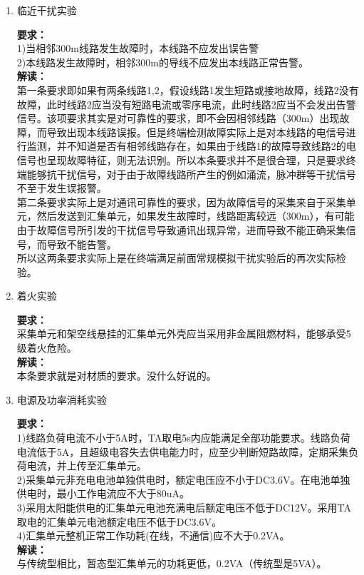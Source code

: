\documentclass{article}
\begin{document}
\begin{CJK}{UTF8}{gbsn}
\begin{enumerate}
\item 临近干扰实验	
	\par
	\textbf{要求：}\\
	1)当相邻300m线路发生故障时，本线路不应发出误告警\\
	2)本线路发生故障时，相邻300m的导线不应发出本线路正常告警。\\
	\textbf{解读：}\\
	第一条要求即如果有两条线路1,2，假设线路1发生短路或接地故障，线路2没有故障，此时线路2应当没有短路电流或零序电流，此时线路2应当不会发出告警信号。该项要求其实是对可靠性的要求，即不会因相邻线路（300m）出现故障，而导致出现本线路误报。但是终端检测故障实际上是对本线路的电信号进行监测，并不知道是否有相邻线路存在，如果由于线路1的故障导致线路2的电信号也呈现故障特征，则无法识别。所以本条要求并不是很合理，只是要求终端能够抗干扰信号，对于由于故障线路所产生的例如涌流，脉冲群等干扰信号不至于发生误报警。\\
	第二条要求实际上是对通讯可靠性的要求，因为故障信号的采集来自于采集单元，然后发送到汇集单元，如果发生故障时，线路距离较远（300m），有可能由于故障信号所引发的干扰信号导致通讯出现异常，进而导致不能正确采集信号，而导致不能告警。
\\
所以这两条要求实际上是在终端满足前面常规模拟干扰实验后的再次实际检验。
\item 着火实验
	\par
	\textbf{要求：}\\
	采集单元和架空线悬挂的汇集单元外壳应当采用非金属阻燃材料，能够承受5级着火危险。\\
	\textbf{解读：}\\
	本条要求就是对材质的要求。没什么好说的。
\item 电源及功率消耗实验
	\par
	\textbf{要求：}\\
	1)线路负荷电流不小于5A时，TA取电5s内应能满足全部功能要求。线路负荷电流低于5A，且超级电容失去供电能力时，应至少判断短路故障，定期采集负荷电流，并上传至汇集单元。\\
	2)采集单元非充电电池单独供电时，额定电压应不小于DC3.6V。在电池单独供电时，最小工作电流应不大于80uA。\\
	3)采用太阳能供电的汇集单元电池充满电后额定电压不低于DC12V。采用TA取电的汇集单元电池额定电压不低于DC3.6V。\\
	4)汇集单元整机正常工作功耗(在线，不通信)应不大于0.2VA。\\
	\textbf{解读：}\\
	与传统型相比，暂态型汇集单元的功耗更低，0.2VA（传统型是5VA）。\\

\end{enumerate}
\end{CJK}
\end{document}
